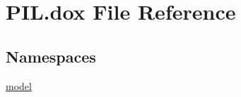 \hypertarget{_p_i_l_8dox}{}\section{P\+I\+L.\+dox File Reference}
\label{_p_i_l_8dox}
\subsection*{Namespaces}
\begin{DoxyCompactItemize}
\item 
 \hyperlink{namespacemodel}{model}
\end{DoxyCompactItemize}

